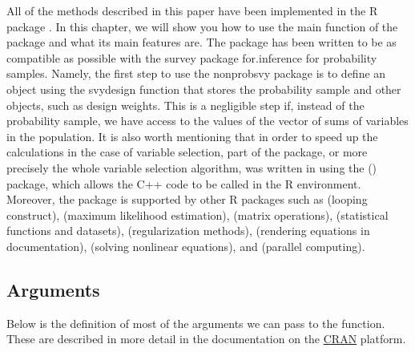 \documentclass[
]{jss}
\begin{document}
All of the methods described in this paper have been implemented in the
R package  \cite{nonprobsvy}. In this chapter, we will
show you how to use the main  function of the package and
what its main features are. The package has been written to be as
compatible as possible with the survey package for.inference for
probability samples. Namely, the first step to use the nonprobsvy
package is to define an object using the svydesign function that stores
the probability sample  and other objects, such as
design weights. This is a negligible step if, instead of the probability
sample, we have access to the values of the vector of sums of variables
in the population. It is also worth mentioning that in order to speed up
the calculations in the case of variable selection, part of the package,
or more precisely the whole variable selection algorithm, was written in
 using the  (\cite{Rcpp}) package, which allows
the C++ code to be called in the R environment. Moreover, the package is
supported by other R packages such as  \cite{foreach}
(looping construct),  \cite{maxLik} (maximum likelihood
estimation),  \cite{Matrix} (matrix operations), 
\citet{MASS} (statistical functions and datasets), 
\cite{ncvreg} (regularization methods),  \cite{mathjaxr}
(rendering equations in documentation),  \cite{nleqslv}
(solving nonlinear equations), and  \cite{doParallel}
(parallel computing).

\hypertarget{arguments}{%
\subsection{Arguments}\label{arguments}}

Below is the definition of most of the arguments we can pass to the
function. These are described in more detail in the documentation on the
\href{https://CRAN.R-project.org/package=nonprobsvy}{CRAN} platform.
\end{document}
